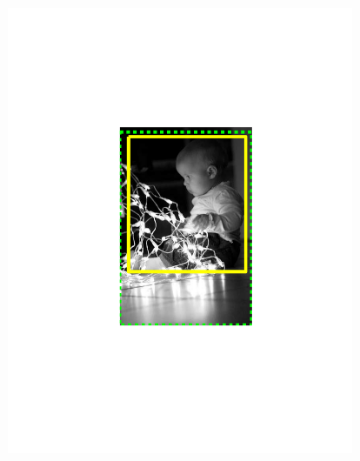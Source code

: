 \begin{figure}[hbt]
    \begin{subfigure}[b]{0.45\textwidth}
        \centering
        \includegraphics[width=\textwidth]{TP48}
        \caption{}
        \label{fig:dettp3}
    \end{subfigure}
    ~
    \begin{subfigure}[b]{0.45\textwidth}
        \centering

\end{subfigure}
\end{figure}
